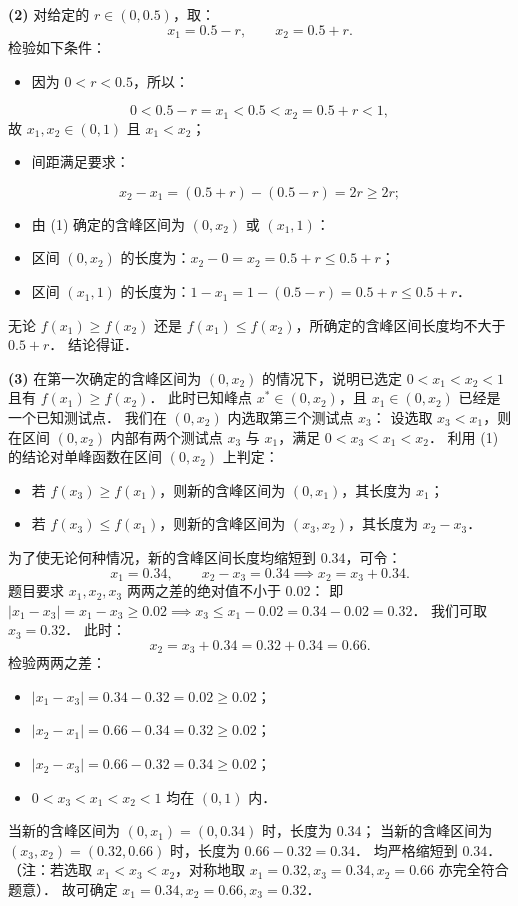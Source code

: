 \begin{answer}
\textbf{(2)}
对给定的 $r \in (0, 0.5)$，取：
\nopagebreak[4]
\[
x_1 = 0.5 - r, \qquad x_2 = 0.5 + r.
\]
检验如下条件：
\begin{itemize}
\item 因为 $0 < r < 0.5$，所以：
\end{itemize}
\nopagebreak[4]
\[0 < 0.5 - r = x_1 < 0.5 < x_2 = 0.5 + r < 1,\]
  故 $x_1, x_2 \in (0, 1)$ 且 $x_1 < x_2$；
\begin{itemize}
\item 间距满足要求：
\end{itemize}
\nopagebreak[4]
\[x_2 - x_1 = (0.5 + r) - (0.5 - r) = 2r \geqslant 2r;\]
\begin{itemize}
\item 由 (1) 确定的含峰区间为 $(0, x_2)$ 或 $(x_1, 1)$：
\item 区间 $(0, x_2)$ 的长度为：$x_2 - 0 = x_2 = 0.5 + r \leqslant 0.5 + r$；
\item 区间 $(x_1, 1)$ 的长度为：$1 - x_1 = 1 - (0.5 - r) = 0.5 + r \leqslant 0.5 + r$．
\end{itemize}
无论 $f(x_1) \geqslant f(x_2)$ 还是 $f(x_1) \leqslant f(x_2)$，所确定的含峰区间长度均不大于 $0.5 + r$．
结论得证．

\textbf{(3)}
在第一次确定的含峰区间为 $(0, x_2)$ 的情况下，说明已选定 $0 < x_1 < x_2 < 1$ 且有 $f(x_1) \geqslant f(x_2)$．
此时已知峰点 $x^* \in (0, x_2)$，且 $x_1 \in (0, x_2)$ 已经是一个已知测试点．
我们在 $(0, x_2)$ 内选取第三个测试点 $x_3$：
设选取 $x_3 < x_1$，则在区间 $(0, x_2)$ 内部有两个测试点 $x_3$ 与 $x_1$，满足 $0 < x_3 < x_1 < x_2$．
利用 (1) 的结论对单峰函数在区间 $(0, x_2)$ 上判定：
\begin{itemize}
\item 若 $f(x_3) \geqslant f(x_1)$，则新的含峰区间为 $(0, x_1)$，其长度为 $x_1$；
\item 若 $f(x_3) \leqslant f(x_1)$，则新的含峰区间为 $(x_3, x_2)$，其长度为 $x_2 - x_3$．
\end{itemize}
为了使无论何种情况，新的含峰区间长度均缩短到 $0.34$，可令：
\nopagebreak[4]
\[
x_1 = 0.34, \qquad x_2 - x_3 = 0.34 \implies x_2 = x_3 + 0.34.
\]
题目要求 $x_1, x_2, x_3$ 两两之差的绝对值不小于 $0.02$：
即 $|x_1 - x_3| = x_1 - x_3 \geqslant 0.02 \implies x_3 \leqslant x_1 - 0.02 = 0.34 - 0.02 = 0.32$．
我们可取 $x_3 = 0.32$．
此时：
\nopagebreak[4]
\[
x_2 = x_3 + 0.34 = 0.32 + 0.34 = 0.66.
\]
检验两两之差：
\begin{itemize}
\item $|x_1 - x_3| = 0.34 - 0.32 = 0.02 \geqslant 0.02$；
\item $|x_2 - x_1| = 0.66 - 0.34 = 0.32 \geqslant 0.02$；
\item $|x_2 - x_3| = 0.66 - 0.32 = 0.34 \geqslant 0.02$；
\item $0 < x_3 < x_1 < x_2 < 1$ 均在 $(0, 1)$ 内．
\end{itemize}
当新的含峰区间为 $(0, x_1) = (0, 0.34)$ 时，长度为 $0.34$；
当新的含峰区间为 $(x_3, x_2) = (0.32, 0.66)$ 时，长度为 $0.66 - 0.32 = 0.34$．
均严格缩短到 $0.34$．
（注：若选取 $x_1 < x_3 < x_2$，对称地取 $x_1 = 0.32, x_3 = 0.34, x_2 = 0.66$ 亦完全符合题意）．
故可确定 $x_1 = 0.34, x_2 = 0.66, x_3 = 0.32$．


\end{answer}
